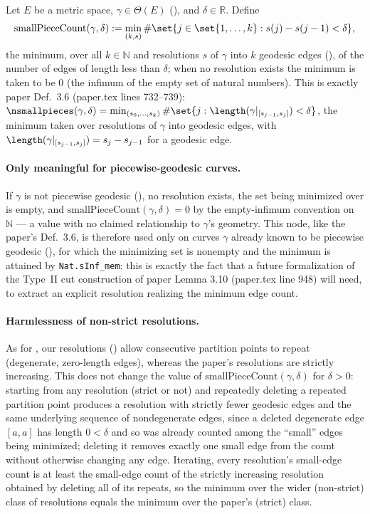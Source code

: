 \begin{definition}
  Let $E$ be a metric space, $\gamma \in \Theta(E)$ (), and $\delta \in
  \mathbb{R}$. Define
  \[
    \mathrm{smallPieceCount}(\gamma,\delta)
    := \min_{(k,s)} \# \set{ j \in \set{1,\dotsc,k} : s(j) - s(j-1) < \delta }
    ,
  \]
  the minimum, over all $k \in \mathbb{N}$ and resolutions $s$ of $\gamma$ into $k$ geodesic edges
  (), of the number of edges of length less than $\delta$; when no
  resolution exists the minimum is taken to be $0$ (the infimum of the empty set of natural
  numbers). This is exactly paper Def.~3.6 (paper.tex lines 732--739):
  $\nsmallpieces(\gamma,\delta) = \min_{(s_0,\dotsc,s_k)} \#\set{j : \length(\gamma|_{[s_{j-1},s_j]})
  < \delta}$, the minimum taken over resolutions of $\gamma$ into geodesic edges, with
  $\length(\gamma|_{[s_{j-1},s_j]}) = s_j - s_{j-1}$ for a geodesic edge.

  \paragraph{Only meaningful for piecewise-geodesic curves.} If $\gamma$ is not piecewise geodesic
  (), no resolution exists, the set being minimized over is empty, and
  $\mathrm{smallPieceCount}(\gamma,\delta) = 0$ by the empty-infimum convention on $\mathbb{N}$ —
  a value with no claimed relationship to $\gamma$'s geometry. This node, like the paper's
  Def.~3.6, is therefore used only on curves $\gamma$ already known to be piecewise geodesic
  (), for which the minimizing set is nonempty and the minimum is
  attained by \texttt{Nat.sInf\_mem}: this is exactly the fact that a future formalization of the
  Type~II cut construction of paper Lemma 3.10 (paper.tex line 948) will need, to extract an
  explicit resolution realizing the minimum edge count.

  \paragraph{Harmlessness of non-strict resolutions.} As for , our resolutions
  () allow consecutive partition points to repeat (degenerate,
  zero-length edges), whereas the paper's resolutions are strictly increasing. This does not change
  the value of $\mathrm{smallPieceCount}(\gamma,\delta)$ for $\delta > 0$: starting from any
  resolution (strict or not) and repeatedly deleting a repeated partition point produces a
  resolution with strictly fewer geodesic edges and the same underlying sequence of nondegenerate
  edges, since a deleted degenerate edge $[a,a]$ has length $0 < \delta$ and so was already counted
  among the ``small'' edges being minimized; deleting it removes exactly one small edge from the
  count without otherwise changing any edge. Iterating, every resolution's small-edge count is at
  least the small-edge count of the strictly increasing resolution obtained by deleting all of its
  repeats, so the minimum over the wider (non-strict) class of resolutions equals the minimum over
  the paper's (strict) class.
\end{definition}
